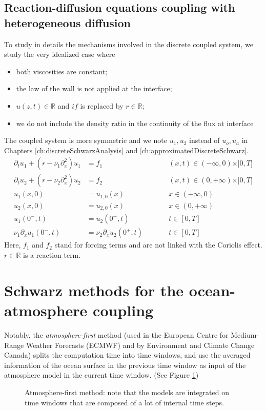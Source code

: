 \subsection{Reaction-diffusion equations coupling
with heterogeneous diffusion}
\label{sec:airseaSCM_reactionDiffusionSection}
To study in details the mechanisms involved in
the discrete coupled system, we study the very idealized
case where
\begin{itemize}
	\item both viscosities are constant;
	\item the law of the wall is not applied
		at the interface;
	\item $u(z,t) \in\mathbb{R}$ and $if$ is replaced by
		$r\in\mathbb{R}$;
	\item we do not include the density ratio
	in the continuity of the flux at interface
\end{itemize}
The coupled system is more symmetric and we note
$u_1, u_2$ instead of $u_o, u_a$ in Chapters
\ref{ch:discreteSchwarzAnalysis} and
\ref{ch:approximatedDiscreteSchwarz}.
\begin{subequations}
\begin{align}
\partial_t u_1 +( r - \nu_1 \partial_x^2) u_1 &= f_1  &\qquad& (x,t) \in (-\infty,0) \times ]0,T] \label{eq:dr1} \\
\partial_t u_2 + ( r - \nu_2 \partial_x^2) u_2  &= f_2  &\qquad& (x,t) \in (0,+\infty) \times ]0,T] \label{eq:dr2}\\
u_1(x,0) &= u_{1,0}(x)   &\qquad&  x \in (-\infty,0)  \\
u_2(x,0) &= u_{2,0}(x)   &\qquad&  x \in (0,+\infty) \\
u_1(0^-,t) &=  u_2(0^+,t) &\qquad& t \in [0,T] \label{eq:interface-dir} \\
\nu_1 \partial_x u_1(0^-,t) &= \nu_2 \partial_x u_2(0^+,t) &\qquad& t \in [0,T] \label{eq:interface-neu} 
\end{align}
\label{eq:model-problem}
\end{subequations}
Here, $f_1$ and $f_2$
stand for forcing terms and are not linked with the Coriolis effect.
$r\in \mathbb{R}$ is a reaction term.

\section{Schwarz methods for the ocean-atmosphere coupling}
Notably, the \textit{atmosphere-first} method
(used in the European Centre for Medium-Range Weather Forecasts
(ECMWF) and by Environment and Climate Change Canada)
splits the computation time into time windows, and use the
averaged information of the ocean surface in the previous
time window as input of the atmosphere model in the current
time window. (See Figure \ref{fig:airseaSCM_atmFirst})
\begin{figure}
\centering
\caption{Atmosphere-first method: note that the models are
	integrated on time windows that are composed of a lot
	of internal time steps.}
\label{fig:airseaSCM_atmFirst}
\end{figure}
